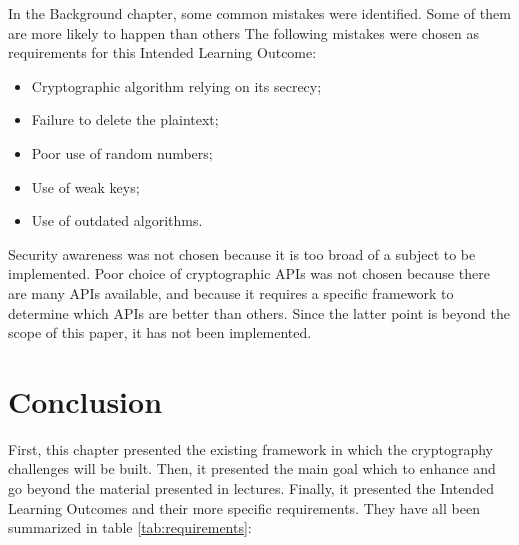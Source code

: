 \documentclass{l4proj}
\begin{document}
In the Background chapter, some common mistakes were identified. 
Some of them are more likely to happen than others
The following mistakes were chosen as requirements for this Intended Learning Outcome:
\begin{itemize}
    \item Cryptographic algorithm relying on its secrecy;
    \item Failure to delete the plaintext;
    \item Poor use of random numbers;
    \item Use of weak keys;
    \item Use of outdated algorithms.
\end{itemize}
Security awareness was not chosen because it is too broad of a subject to be implemented. 
Poor choice of cryptographic APIs was not chosen because there are many APIs available,
and because it requires a specific framework to determine which APIs are better than others.
Since the latter point is beyond the scope of this paper, it has not been implemented. 

\section{Conclusion}

First, this chapter presented the existing framework in which the cryptography challenges will be
built. Then, it presented the main goal which to enhance and go beyond the material presented in lectures.
Finally, it presented the Intended Learning Outcomes and their more specific requirements.
They have all been summarized in table \ref{tab:requirements}:
\end{document}
